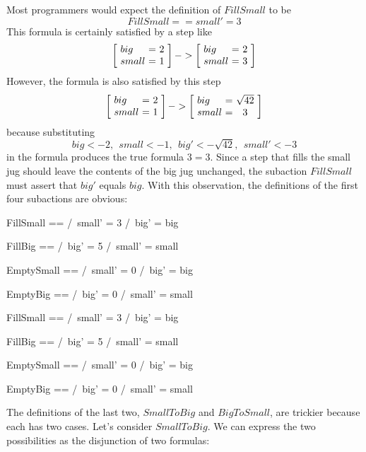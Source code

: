 \documentclass[fleqn,leqno]{article}
\makeatletter
\newcommand{\dhstate}[2]{\left[\!\begin{array}{l@{\,\,}c@{\,\,}c}
                        big & = & #1 \\ small & = & #2
                        \end{array}\!\right]}
\makeatother
\begin{document}
Most programmers would expect the definition of $FillSmall$ to be
 \[ FillSmall == small' = 3 \]
This formula is certainly satisfied by a step like
 \[ \dhstate{2}{1} -> \dhstate{2}{3}
 \]
However, the formula is also satisfied by this step
  \[ \dhstate{2}{1} -> \dhstate{\sqrt{42}}{3}
 \]
because substituting
 \[ big <- 2, \ \ small <- 1, \ \ big' <- \sqrt{42}, \ \ small' <- 3
 \]
in the formula produces the true formula $3=3$.  Since a step that
fills the small jug should leave the contents of the big jug
unchanged, the subaction $FillSmall$ must assert that $big'$ equals
$big$.  With this observation, the definitions of the first four
subactions are obvious:
 \medskip
\begin{twocols}%
\begin{notla}
FillSmall  == /\ small' = 3 
              /\ big' = big

FillBig    == /\ big' = 5 
              /\ small' = small

EmptySmall == /\ small' = 0 
              /\ big' = big

EmptyBig   == /\ big' = 0 
              /\ small' = small
\end{notla}
\begin{tlatex}
%
%
\@pvspace{8.0pt}%
%
%
\@pvspace{8.0pt}%
%
%
\@pvspace{8.0pt}%
%
%
\end{tlatex}
\midcol
\begin{verbatim*}
FillSmall  == /\ small' = 3 
              /\ big' = big

FillBig    == /\ big' = 5 
              /\ small' = small

EmptySmall == /\ small' = 0 
              /\ big' = big

EmptyBig   == /\ big' = 0 
              /\ small' = small
\end{verbatim*} 
\end{twocols} 
 \medskip
%
The definitions of the last two, $SmallToBig$ and $BigToSmall$, are
trickier because each has two cases.  Let's consider $SmallToBig$.
We can express the two possibilities as the disjunction of two
formulas:
\end{document}
